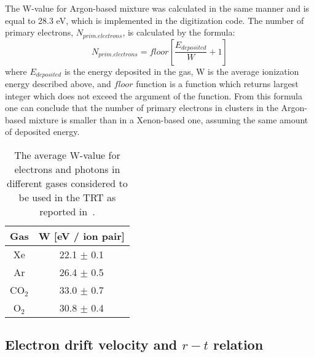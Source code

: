 The W-value for Argon-based mixture was calculated in the same manner and is equal to 28.3 eV, which is implemented in the digitization code.
The number of primary electrons, $N_{prim.electrons}$, is calculated by the formula:
\begin{equation}
 N_{prim.electrons} = floor \left[\dfrac{E_{deposited}}{W} + 1\right]
\end{equation}
where $E_{deposited}$ is the energy deposited in the gas, W is the average ionization energy described above, and $floor$ function is a function which returns
largest integer which does not exceed the argument of the function.
From this formula one can conclude that the number of primary electrons in clusters in the Argon-based mixture is smaller than in a Xenon-based one, 
assuming the same amount of deposited energy.

\begin{table}[p]
  \begin{tabular}{c|c}
    Gas & W [eV / ion pair]\\
    \hline
    Xe & 22.1 $\pm$ 0.1 \\
    Ar & 26.4 $\pm$ 0.5 \\
    CO$_2$ & 33.0 $\pm$ 0.7 \\
    O$_2$ & 30.8 $\pm$ 0.4 \\
  \end{tabular}
  \caption{The average W-value for electrons and photons in different gases considered to be used in the TRT as reported in~\cite{cwetanski_thesis}.}
  \label{tab:ionization_energy}
\end{table}

\subsection{Electron drift velocity and $r-t$ relation}

